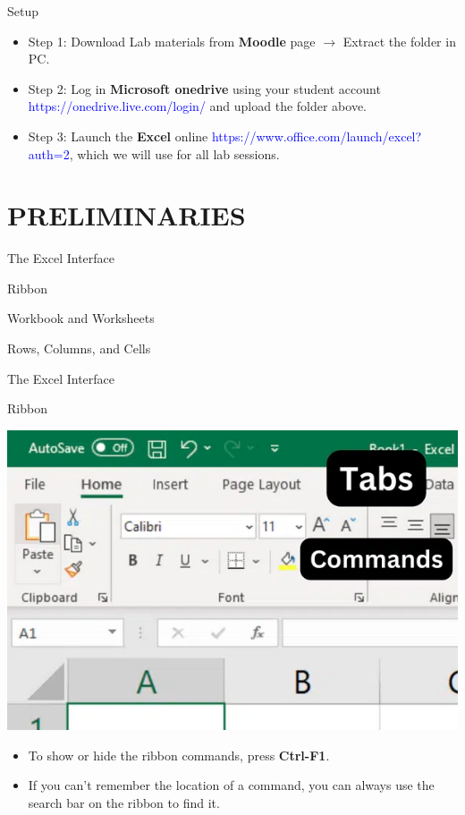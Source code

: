 \documentclass[
  10pt,
  ignorenonframetext,
]{beamer}
\begin{document}
\begin{frame}{Setup}
\protect\hypertarget{setup}{}
\begin{itemize}
\item
  Step 1: Download Lab materials from \textbf{Moodle} page
  \(\rightarrow\) Extract the folder in PC.
\item
  Step 2: Log in \textbf{Microsoft onedrive} using your student account
  \textcolor{blue}{https://onedrive.live.com/login/} and upload the
  folder above.
\item
  Step 3: Launch the \textbf{Excel} online
  \textcolor{blue}{https://www.office.com/launch/excel?auth=2}, which we
  will use for all lab sessions.
\end{itemize}
\end{frame}

\hypertarget{preliminaries}{%
\section{PRELIMINARIES}\label{preliminaries}}

\begin{frame}{The Excel Interface}
\protect\hypertarget{the-excel-interface}{}
\begin{block}{Ribbon}
\protect\hypertarget{ribbon}{}
\end{block}

\begin{block}{Workbook and Worksheets}
\protect\hypertarget{workbook-and-worksheets}{}
\end{block}

\begin{block}{Rows, Columns, and Cells}
\protect\hypertarget{rows-columns-and-cells}{}
\end{block}
\end{frame}

\begin{frame}{The Excel Interface}
\protect\hypertarget{the-excel-interface-1}{}
\begin{block}{Ribbon}
\protect\hypertarget{ribbon-1}{}
\begin{center}\includegraphics[width=0.5\linewidth]{pictures/Excel-ribbon} \end{center}

\begin{itemize}
\item
  To show or hide the ribbon commands, press \textbf{Ctrl-F1}.
\item
  If you can't remember the location of a command, you can always use
  the search bar on the ribbon to find it.
\end{itemize}
\end{block}
\end{frame}
\end{document}
